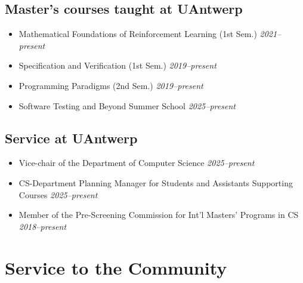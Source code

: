 \documentclass[10pt,a4paper]{moderncv}
\begin{document}
\subsection{Master's courses taught at UAntwerp}
\begin{itemize}
  \item Mathematical Foundations of Reinforcement Learning (1st Sem.) \hfill \textit{2021--present}
  \item Specification and Verification (1st Sem.) \hfill \textit{2019--present}
  \item Programming Paradigms (2nd Sem.) \hfill \textit{2019--present}
  \item Software Testing and Beyond Summer School \hfill \textit{2025--present}
\end{itemize}

\subsection{Service at UAntwerp}
\begin{itemize}
  \item Vice-chair of the Department of Computer Science \hfill
    \textit{2025--present}
  \item CS-Department Planning Manager for Students and
    Assistants Supporting Courses \hfill \textit{2025--present}
  \item Member of the Pre-Screening Commission for Int'l Masters'
    Programs in CS \hfill \textit{2018--present}
\end{itemize}

\section{Service to the Community}
\end{document}
